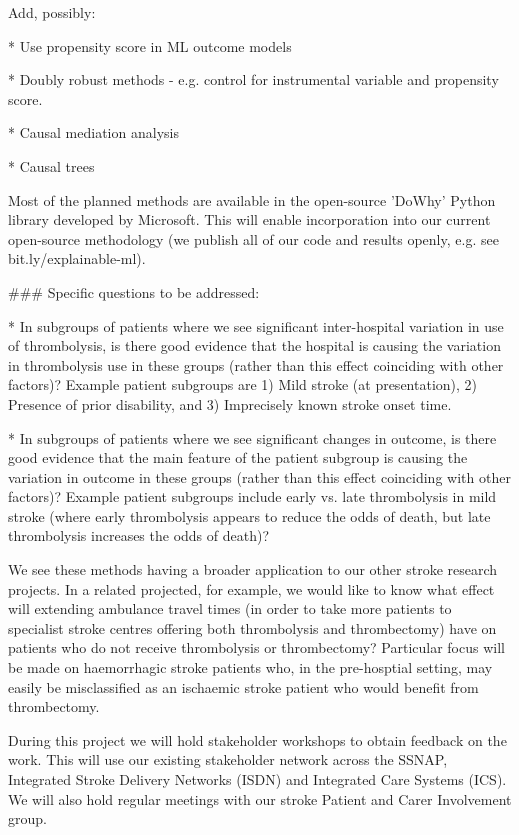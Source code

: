 \begin{markdown}
Add, possibly:

    * Use propensity score in ML outcome models

    * Doubly robust methods - e.g. control for instrumental variable and propensity score.

    * Causal mediation analysis

    * Causal trees

Most of the planned methods are available in the open-source 'DoWhy' Python library developed by Microsoft. This will enable incorporation into our current open-source methodology (we publish all of our code and results openly, e.g. see bit.ly/explainable-ml).
 
### Specific questions to be addressed:

* In subgroups of patients where we see significant inter-hospital variation in use of thrombolysis, is there good evidence that the hospital is causing the variation in thrombolysis use in these groups (rather than this effect coinciding with other factors)? Example patient subgroups are 1) Mild stroke (at presentation), 2) Presence of prior disability, and 3) Imprecisely known stroke onset time.

* In subgroups of patients where we see significant changes in outcome, is there good evidence that the main feature of the patient subgroup is causing the variation in outcome in these groups (rather than this effect coinciding with other factors)? Example patient subgroups include early vs. late thrombolysis in mild stroke (where early thrombolysis appears to reduce the odds of death, but late thrombolysis increases the odds of death)?

We see these methods having a broader application to our other stroke research projects. In a related projected, for example, we would like to know what effect will extending ambulance travel times (in order to take more patients to specialist stroke centres offering both thrombolysis and thrombectomy) have on patients who do not receive thrombolysis or thrombectomy? Particular focus will be made on haemorrhagic stroke patients who, in the pre-hosptial setting, may easily be misclassified as an ischaemic stroke patient who would benefit from thrombectomy.

During this project we will hold stakeholder workshops to obtain feedback on the work. This will use our existing stakeholder network across the SSNAP, Integrated Stroke Delivery Networks (ISDN) and Integrated Care Systems (ICS). We will also hold regular meetings with our stroke Patient and Carer Involvement group.


\end{markdown}
